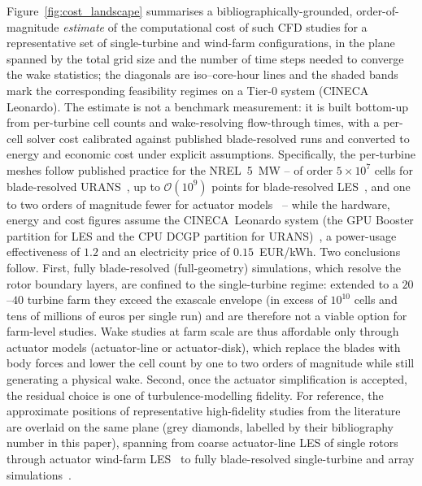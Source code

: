Figure~\ref{fig:cost_landscape} summarises a bibliographically-grounded, order-of-magnitude \emph{estimate} of the computational cost of such CFD studies for a representative set of single-turbine and wind-farm configurations, in the plane spanned by the total grid size and the number of time steps needed to converge the wake statistics; the diagonals are iso--core-hour lines and the shaded bands mark the corresponding feasibility regimes on a Tier-0 system (CINECA Leonardo). The estimate is not a benchmark measurement: it is built bottom-up from per-turbine cell counts and wake-resolving flow-through times, with a per-cell solver cost calibrated against published blade-resolved runs and converted to energy and economic cost under explicit assumptions. Specifically, the per-turbine meshes follow published practice for the NREL~5~MW -- of order $5\times10^{7}$ cells for blade-resolved URANS~\cite{Sebastiani2024}, up to $\mathcal{O}(10^{9})$ points for blade-resolved LES~\cite{Sharma2024Exawind}, and one to two orders of magnitude fewer for actuator models~\cite{coarseALM2016,Troldborg} -- while the hardware, energy and cost figures assume the CINECA~Leonardo system (the GPU Booster partition for LES and the CPU DCGP partition for URANS)~\cite{Turisini2023Leonardo}, a power-usage effectiveness of $1.2$ and an electricity price of $0.15$~EUR/kWh. Two conclusions follow. First, fully blade-resolved (full-geometry) simulations, which resolve the rotor boundary layers, are confined to the single-turbine regime: extended to a $20$--$40$ turbine farm they exceed the exascale envelope (in excess of $10^{10}$ cells and tens of millions of euros per single run) and are therefore not a viable option for farm-level studies. Wake studies at farm scale are thus affordable only through actuator models (actuator-line or actuator-disk), which replace the blades with body forces and lower the cell count by one to two orders of magnitude while still generating a physical wake. Second, once the actuator simplification is accepted, the residual choice is one of turbulence-modelling fidelity. For reference, the approximate positions of representative high-fidelity studies from the literature are overlaid on the same plane (grey diamonds, labelled by their bibliography number in this paper), spanning from coarse actuator-line LES of single rotors~\cite{coarseALM2016,Troldborg} through actuator wind-farm LES~\cite{Steiner2021,Deskos2018,Joulin2019,Sebastiani2021Lillgrund,Stevens2014,King_2018,alessio5-mw,Carloni2026} to fully blade-resolved single-turbine and array simulations~\cite{Sebastiani2024,Sharma2024Exawind,Kirby2019}.

